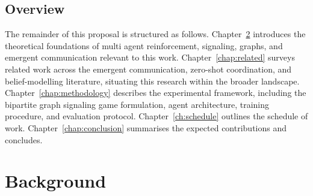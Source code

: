 \documentclass[a4paper,twoside,12pt]{report}
\begin{document}
    \section{Overview}
    The remainder of this proposal is structured as follows. Chapter~\ref{chap:background} 
    introduces the theoretical foundations of multi agent reinforcement, signaling, graphs, and emergent communication relevant to this work. 
    Chapter~\ref{chap:related} surveys related work across the emergent communication, zero-shot coordination, and belief-modelling literature, situating this research 
    within the broader landscape. Chapter~\ref{chap:methodology} describes the 
    experimental framework, including the bipartite graph signaling game formulation, 
    agent architecture, training procedure, and evaluation protocol. 
    Chapter~\ref{ch:schedule} outlines the schedule of work. 
    Chapter~\ref{chap:conclusion} summarises the expected contributions and concludes.
    
    
    
    
    \chapter{Background}
     \label{chap:background}
    
    
    
    
    
    
    
\end{document}
